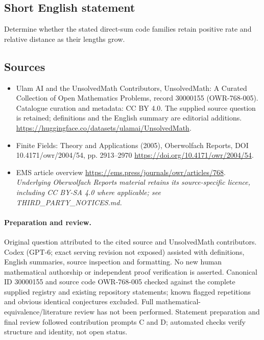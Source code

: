 \documentclass[11pt]{article}
\begin{document}
\subsection{Short English statement}
Determine whether the stated direct-sum code families retain positive rate and relative distance as their lengths grow.
\subsection{Sources}
\begin{itemize}
\item[\hypertarget{source:30000155:1}{S1}] Ulam AI and the UnsolvedMath Contributors, UnsolvedMath: A Curated Collection of Open Mathematics Problems, record 30000155 (OWR-768-005). Catalogue curation and metadata: CC BY 4.0. The supplied source question is retained; definitions and the English summary are editorial additions.
\url{https://huggingface.co/datasets/ulamai/UnsolvedMath}.
\item[\hypertarget{source:30000155:2}{S2}] Finite Fields: Theory and Applications (2005), Oberwolfach Reports, DOI 10.4171/owr/2004/54, pp. 2913--2970
\url{https://doi.org/10.4171/owr/2004/54}.
\item[\hypertarget{source:30000155:3}{S3}] EMS article overview
\url{https://ems.press/journals/owr/articles/768}.
\textit{Underlying Oberwolfach Reports material retains its source-specific licence, including CC BY-SA 4.0 where applicable; see THIRD\_PARTY\_NOTICES.md.}
\end{itemize}
\paragraph{Preparation and review.}
Original question attributed to the cited source and UnsolvedMath contributors. Codex (GPT-6; exact serving revision not exposed) assisted with definitions, English summaries, source inspection and formatting. No new human mathematical authorship or independent proof verification is asserted. Canonical ID 30000155 and source code OWR-768-005 checked against the complete supplied registry and existing repository statements; known flagged repetitions and obvious identical conjectures excluded. Full mathematical-equivalence/literature review has not been performed. Statement preparation and final review followed contribution prompts C and D; automated checks verify structure and identity, not open status.
\label{end:30000155}
\end{document}
